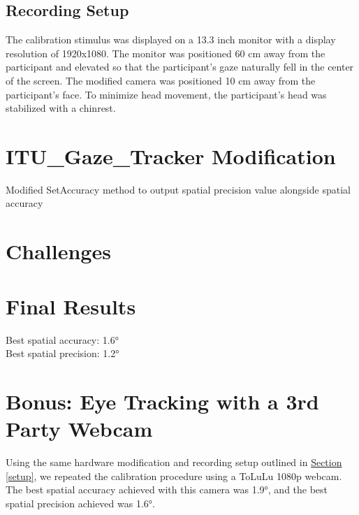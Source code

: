 \documentclass[11pt]{article}
\begin{document}
\subsection{Recording Setup}
The calibration stimulus was displayed on a 13.3 inch monitor with a display resolution of 1920x1080. The monitor was positioned 60 cm away from the participant and elevated so that the participant's gaze naturally fell in the center of the screen. The modified camera was positioned 10 cm away from the participant's face. To minimize head movement, the participant's head was stabilized with a chinrest. 

\section{ITU\_Gaze\_Tracker Modification} %
Modified SetAccuracy method to output spatial precision value alongside spatial accuracy
\section{Challenges} %

\section{Final Results} %
Best spatial accuracy: \ang{1.6} \\
Best spatial precision: \ang{1.2}

\section{Bonus: Eye Tracking with a 3rd Party Webcam}
Using the same hardware modification and recording setup outlined in \hyperref[setup]{Section \ref{setup}}, we repeated the calibration procedure using a ToLuLu 1080p webcam. The best spatial accuracy achieved with this camera was \ang{1.9}, and the best spatial precision achieved was \ang{1.6}.

\end{document}
